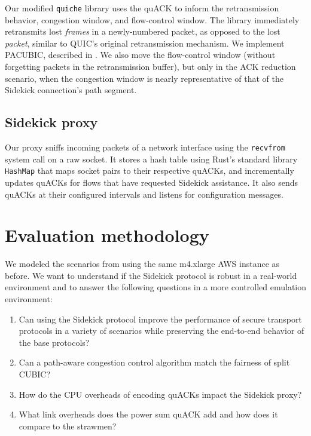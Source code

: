 Our modified \texttt{quiche} library uses the quACK to inform the
retransmission behavior, congestion window, and flow-control window. The library
immediately retransmits lost \emph{frames} in a newly-numbered
packet, as opposed to the lost \emph{packet}, similar to QUIC's original
retransmission mechanism. We implement PACUBIC,
described in .
We also move the flow-control window (without forgetting packets in the
retransmission buffer), but only in the ACK reduction scenario, when the
congestion window is nearly representative of that of the Sidekick connection's
path segment.

\subsection{Sidekick proxy}
\label{sec:sidekick:implementation:proxy}

Our proxy sniffs incoming packets of a network interface using the
\texttt{recvfrom} system call on a raw socket.
It stores a hash table using Rust's standard library \texttt{HashMap} that maps
socket pairs to their respective quACKs, and incrementally updates quACKs
for flows that have requested Sidekick assistance. It also sends quACKs at
their configured intervals and listens for configuration messages.

\section{Evaluation methodology}
\label{sec:sidekick:methodology}



We modeled the scenarios from  using
the same m4.xlarge AWS instance as before. We want
to understand if the Sidekick protocol is robust in a real-world environment
and to answer the following questions in a more controlled emulation
environment:
\begin{enumerate}[noitemsep,topsep=0pt]
	\item Can using the Sidekick protocol improve the performance of secure
	transport protocols in a variety of scenarios while preserving the end-to-end
	behavior of the base protocols?
	\item Can a path-aware congestion control algorithm match the fairness of
	split CUBIC?
	\item How do the CPU overheads of encoding quACKs impact the Sidekick proxy?
	\item What link overheads does the power sum quACK add and how does it
	compare to the strawmen?
\end{enumerate}

